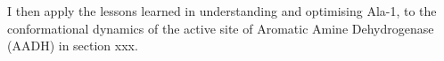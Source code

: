 I then apply the lessons learned in understanding and optimising Ala-1, to the conformational dynamics of the active site of Aromatic Amine Dehydrogenase (AADH) in section xxx. 





